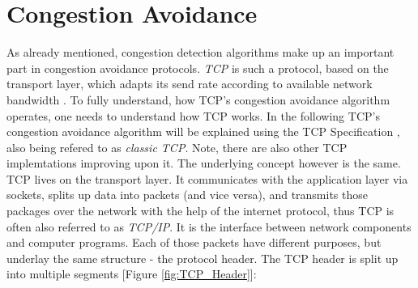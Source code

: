 \documentclass[a4paper,conference]{IEEEtran}
\begin{document}
\section{Congestion Avoidance}
\label{sec:ca}
As already mentioned, congestion detection algorithms make up an important part in congestion avoidance protocols. \textit{TCP} is such a protocol, based on the transport layer, which adapts its send rate according to available network bandwidth \cite{1209197,jacobson1992tcp}. To fully understand, how TCP's congestion avoidance algorithm operates, one needs to understand how TCP works. In the following TCP's congestion avoidance algorithm will be explained using the TCP Specification \cite{ietf-tcpm-rfc793bis-16,postel1981transmission}, also being refered to as \textit{classic TCP}. Note, there are also other TCP implemtations improving upon it. The underlying concept however is the same.
\\TCP lives on the transport layer. It communicates with the application layer via sockets, splits up data into packets (and vice versa), and transmits those packages over the network with the help of the internet protocol, thus TCP is often also referred to as \textit{TCP/IP}. It is the interface between network components and computer programs. Each of those packets have different purposes, but underlay the same structure - the protocol header. The TCP header is split up into multiple segments [Figure \ref{fig:TCP_Header}]:
\end{document}
